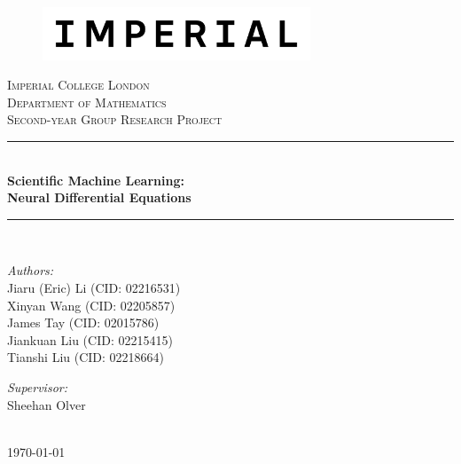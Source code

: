 \documentclass[a4paper,11pt,titlepage]{article}
\theoremstyle{definition}
\theoremstyle{plain}
\theoremstyle{remark}
\newcommand{\reporttitle}{Scientific Machine Learning:\\Neural Differential Equations}
\newcommand{\reportauthorA}{Jiaru (Eric) Li (CID: 02216531)}
\newcommand{\reportauthorB}{Xinyan Wang (CID: 02205857)}
\newcommand{\reportauthorC}{James Tay (CID: 02015786)}
\newcommand{\reportauthorD}{Jiankuan Liu (CID: 02215415)}
\newcommand{\reportauthorE}{Tianshi Liu (CID: 02218664)}
\newcommand{\supervisor}{Sheehan Olver}
\begin{document}
\begin{titlepage}
\newcommand{\HRule}{\rule{\linewidth}{0.5mm}}
\begin{figure}[h]
  \includegraphics[width=8cm]{figures/Imperial_logo.png}
  \vspace{1cm}
\end{figure}
\center
\textsc{\LARGE Imperial College London}\\[0.5cm] 
\textsc{\Large Department of Mathematics}\\[1.5cm] 
\textsc{\Large Second-year Group Research Project}\\[0.5cm]
\makeatletter
\HRule\\[0.6cm]
{\huge\bfseries\reporttitle}\\[0.6cm]
\HRule\\[1.5cm]
\begin{minipage}{0.4\textwidth}
\begin{flushleft}\large
\emph{Authors:}\\
\reportauthorA\\
\reportauthorB\\
\reportauthorC\\
\reportauthorD\\
\reportauthorE
\end{flushleft}
\end{minipage}
\begin{minipage}{0.4\textwidth}
\begin{flushright}\large
\emph{Supervisor:}\\
\supervisor
\end{flushright}
\end{minipage}\\[2cm]
\makeatother
\vfill
\makeatletter
{\large\today}\\[2cm]
\makeatother
\end{titlepage}

\begin{abstract}

This report delves into the integration of neural networks with differential equations, known as neural differential equations, within the field of scientific machine learning. They offer a continuous-time model that is particularly effective for handling time series data, surpassing traditional methods that operate in discrete time. We explore the core principles of neural networks, their architecture, and training techniques, and then introduce neural ordinary differential equations, highlighting their formulation and practical applications. As an extension, we briefly discuss neural controlled differential equations. This study not only highlights the theoretical importance of neural differential equations but also showcases their potential in various applications.

\end{abstract}
\tableofcontents
\pagebreak
\end{document}
